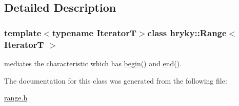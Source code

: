 \subsection{Detailed Description}
\subsubsection*{template$<$typename Iterator\-T$>$class hryky\-::\-Range$<$ Iterator\-T $>$}

mediates the characteristic which has \hyperlink{classhryky_1_1_range_aaa45d0481e79fb4d22ec8f048fa23086}{begin()} and \hyperlink{classhryky_1_1_range_a202ec210efd7e9cb9a22b2e98ab21107}{end()}. 

The documentation for this class was generated from the following file\-:\begin{DoxyCompactItemize}
\item 
\hyperlink{range_8h}{range.\-h}\end{DoxyCompactItemize}
